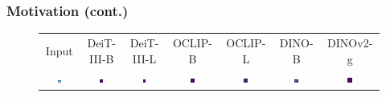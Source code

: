 \documentclass[aspectratio=169]{beamer}
\begin{document}
\begin{frame}
\frametitle{Motivation (cont.)}
\vspace{0.5em}
\begin{figure}[h]
    \centering
    {\footnotesize
    \setlength{\tabcolsep}{2.5pt} %
    \renewcommand{\arraystretch}{0.4} %
    \begin{tabular}{c cc cc cc }
      \vspace{0.2em}
      Input & DeiT-III-B & DeiT-III-L & OCLIP-B & OCLIP-L & DINO-B & DINOv2-g \\
      \includegraphics[width=0.10\textwidth]{resources/230914_1202_fig2_vizs_various_models/109_orig.png} &
      \includegraphics[width=0.10\textwidth]{resources/230914_1202_fig2_vizs_various_models/deit3_base_patch16_224.fb_in22k_ft_in1k_109_lastattmap.png} &
      \includegraphics[width=0.10\textwidth]{resources/230914_1202_fig2_vizs_various_models/deit3_large_patch16_224.fb_in22k_ft_in1k_109_lastattmap.png} &
      \includegraphics[width=0.10\textwidth]{resources/230914_1202_fig2_vizs_various_models/vit_base_patch16_clip_224.laion2b_109_lastattmap.png} &
      \includegraphics[width=0.10\textwidth]{resources/230914_1202_fig2_vizs_various_models/vit_large_patch14_clip_224.laion2b_109_lastattmap.png} &
      \includegraphics[width=0.10\textwidth]{resources/230914_1202_fig2_vizs_various_models/vit_base_patch16_224.dino_109_lastattmap.png} &
      \includegraphics[width=0.10\textwidth]{resources/230914_1202_fig2_vizs_various_models/vit_giant_patch14_dinov2.lvd142m_109_lastattmap.png}

\end{tabular}}
\end{figure}
\end{frame}
\end{document}
